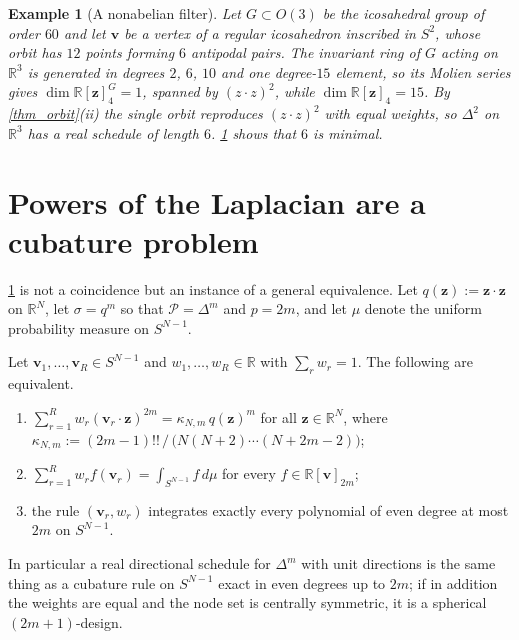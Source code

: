 \documentclass[final]{siamltex}
\newtheorem{example}[example]{Example}
\newcommand{\R}{\mathbb{R}}
\newcommand{\bz}{\bm{z}}
\newcommand{\bv}{\bm{v}}
\begin{document}
\begin{example}[A nonabelian filter]\label{ex_icosa}
  Let $G \subset O(3)$ be the icosahedral group of order $60$ and let
  $\bv$ be a vertex of a regular icosahedron inscribed in $S^{2}$, whose orbit
  has $12$ points forming $6$ antipodal pairs.  The invariant ring of $G$ acting
  on $\R^{3}$ is generated in degrees $2$, $6$, $10$ and one degree-$15$
  element, so its Molien series gives
  $\dim \R[\bz]_{4}^{G} = 1$, spanned by $(z\cdot z)^{2}$, while
  $\dim\R[\bz]_{4} = 15$.  By \cref{thm_orbit}(ii) the single orbit reproduces
  $(z \cdot z)^{2}$ with equal weights, so $\Delta^{2}$ on $\R^{3}$ has a real
  schedule of length $6$.  \cref{sec_cubature} shows that $6$ is minimal.
\end{example}

\section{Powers of the Laplacian are a cubature problem}\label{sec_cubature}

\cref{ex_icosa} is not a coincidence but an instance of a general equivalence.
Let $q(\bz) := \bz\cdot\bz$ on $\R^{N}$, let $\sigma = q^{m}$ so that
$\mathcal{P} = \Delta^{m}$ and $p = 2m$, and let $\mu$ denote the uniform
probability measure on $S^{N-1}$.

\begin{theorem}\label{thm_cubature}
  Let $\bv_{1},\ldots,\bv_{R} \in S^{N-1}$ and $w_{1},\ldots,w_{R} \in \R$ with
  $\sum_{r} w_{r} = 1$.  The following are equivalent.
  \begin{enumerate}[label=\textup{(\roman*)}]
    \item $\sum_{r=1}^{R} w_{r}(\bv_{r}\cdot\bz)^{2m} = \kappa_{N,m}\,q(\bz)^{m}$
      for all $\bz \in \R^{N}$, where
      $\kappa_{N,m} := (2m-1)!!\,/\,\bigl(N(N+2)\cdots(N+2m-2)\bigr)$;
    \item $\displaystyle\sum_{r=1}^{R} w_{r}f(\bv_{r}) = \int_{S^{N-1}} f\,d\mu$
      for every $f \in \R[\bv]_{2m}$;
    \item the rule $(\bv_{r},w_{r})$ integrates exactly every polynomial of even
      degree at most $2m$ on $S^{N-1}$.
  \end{enumerate}
  In particular a real directional schedule for $\Delta^{m}$ with unit directions
  is the same thing as a cubature rule on $S^{N-1}$ exact in even degrees up to
  $2m$; if in addition the weights are equal and the node set is centrally
  symmetric, it is a spherical $(2m{+}1)$-design.
\end{theorem}
\end{document}
